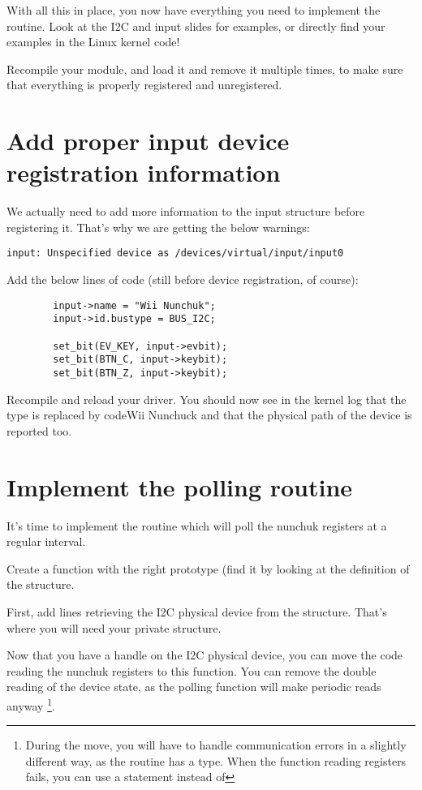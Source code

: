 With all this in place, you now have everything you need to implement
the  routine. Look at the I2C and input slides for
examples, or directly find your examples in the Linux kernel code!

Recompile your module, and load it and remove it multiple times, to
make sure that everything is properly registered and unregistered.

\section{Add proper input device registration information}

We actually need to add more information to the input structure before
registering it. That's why we are getting the below warnings:

\begin{verbatim}
input: Unspecified device as /devices/virtual/input/input0
\end{verbatim}

Add the below lines of code (still before device registration, of
course):

\begin{verbatim}
        input->name = "Wii Nunchuk";
        input->id.bustype = BUS_I2C;

        set_bit(EV_KEY, input->evbit);
        set_bit(BTN_C, input->keybit);
        set_bit(BTN_Z, input->keybit);
\end{verbatim}

Recompile and reload your driver. You should now see in the kernel log
that the  type is replaced by 
code{Wii Nunchuck} and that the physical path of the device is reported
too. 

\section{Implement the polling routine}

It's time to implement the routine which will poll the nunchuk registers
at a regular interval. 

Create a  function with the right prototype (find
it by looking at the definition of the  structure.

First, add lines retrieving the I2C physical device from the
 structure. That's where you will need your
private  structure.

Now that you have a handle on the I2C physical device, you can move the
code reading the nunchuk registers to this function. You can
remove the double reading of the device state, as the polling function
will make periodic reads anyway \footnote{During the move, you will have
to handle communication errors in a slightly different way, as the
 routine has a  type. When the function 
reading registers fails, you can use a  statement instead
of }.

